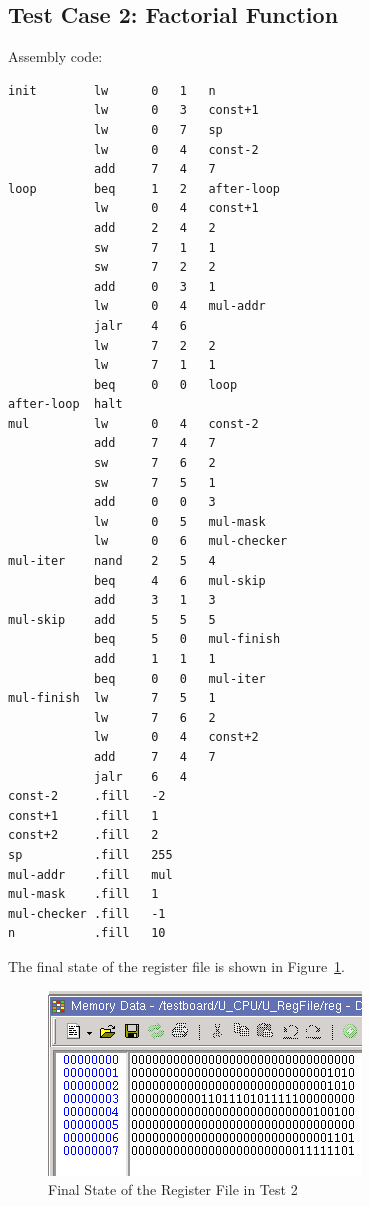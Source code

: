 \documentclass[a4paper]{article}
\begin{document}
\subsection{Test Case 2: Factorial Function}

Assembly code:

\begin{verbatim}
init        lw      0   1   n
            lw      0   3   const+1
            lw      0   7   sp
            lw      0   4   const-2
            add     7   4   7
loop        beq     1   2   after-loop
            lw      0   4   const+1
            add     2   4   2
            sw      7   1   1
            sw      7   2   2
            add     0   3   1
            lw      0   4   mul-addr
            jalr    4   6
            lw      7   2   2
            lw      7   1   1
            beq     0   0   loop
after-loop  halt
mul         lw      0   4   const-2
            add     7   4   7
            sw      7   6   2
            sw      7   5   1
            add     0   0   3
            lw      0   5   mul-mask
            lw      0   6   mul-checker
mul-iter    nand    2   5   4
            beq     4   6   mul-skip
            add     3   1   3
mul-skip    add     5   5   5
            beq     5   0   mul-finish
            add     1   1   1
            beq     0   0   mul-iter
mul-finish  lw      7   5   1
            lw      7   6   2
            lw      0   4   const+2
            add     7   4   7
            jalr    6   4
const-2     .fill   -2
const+1     .fill   1
const+2     .fill   2
sp          .fill   255
mul-addr    .fill   mul
mul-mask    .fill   1
mul-checker .fill   -1
n           .fill   10
\end{verbatim}

The final state of the register file is shown in Figure~\ref{fig:reg_test2}.
\begin{figure}[ht!]
    \center
    \includegraphics[scale=0.6]{reg_test2}
    \caption{Final State of the Register File in Test 2}\label{fig:reg_test2}
\end{figure}
\end{document}
